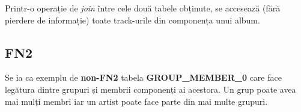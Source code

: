 \documentclass[a4paper, oneside, 12pt]{article}
\newcommand{\rowstyle}[1]{\gdef\currentrowstyle{#1}%
  #1\ignorespaces
}
\begin{document}
Printr-o operație de \emph{join} între cele două tabele obținute, se accesează
(fără pierdere de informație) toate track-urile din componența unui album.



\begin{table}[h]
\centering
\caption*{Tabela \textbf{ALBUMS\_1}:}
\end{table}

\begin{table}[H]
\centering
\caption*{Tabela \textbf{ALBUMS\_2}:}
\end{table}

\subsection{FN2}

Se ia ca exemplu de \textbf{non-FN2} tabela \textbf{GROUP\_MEMBER\_0} care face
legătura dintre grupuri și membrii componenți ai acestora. Un grup poate avea
mai mulți membri iar un artist poate face parte din mai multe grupuri.


\begin{table}[H]
\centering
\caption*{Tabela \textbf{GROUP\_MEMBER\_0}:}
\end{table}
\end{document}
